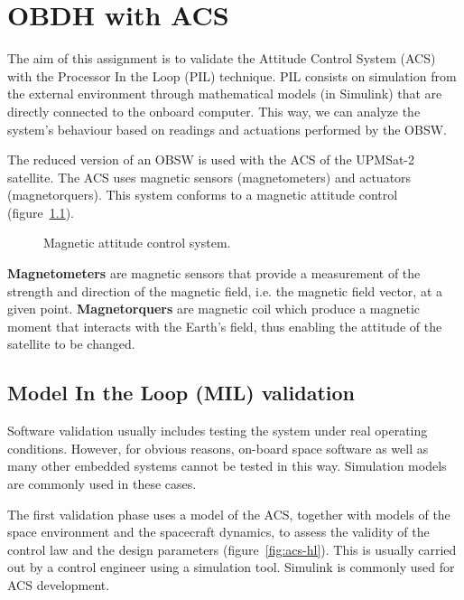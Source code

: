 \chapter{OBDH with ACS}\label{ch:obdh-acs}

The aim of this assignment is to validate the Attitude Control System (ACS)
with the Processor In the Loop (PIL) technique.
PIL consists on simulation from the external environment
through mathematical models (in Simulink)
that are directly connected to the onboard computer.
This way, we can analyze the system's behaviour
based on readings and actuations performed by the OBSW.

The reduced version of an OBSW
is used with the ACS of the UPMSat-2 satellite.
The ACS uses magnetic sensors (magnetometers) and actuators (magnetorquers).
This system conforms to a magnetic attitude control (figure~\ref{fig:acs}).

\begin{figure}[hbtp!]
	\caption{Magnetic attitude control system.}
	\label{fig:acs}
\end{figure}

\textbf{Magnetometers} are magnetic sensors
that provide a measurement of the strength
and direction of the magnetic field, i.e. the magnetic field vector,
at a given point.
\textbf{Magnetorquers} are magnetic coil which produce a magnetic moment that interacts with the Earth's field,
thus enabling the attitude of the satellite to be changed.


\section{Model In the Loop (MIL) validation}

Software validation usually includes testing the system under real operating conditions.
However, for obvious reasons, on-board space software as well as many other embedded systems cannot be tested in this way.
Simulation models are commonly used in these cases.

The first validation phase uses a model of the ACS,
together with models of the space environment and the spacecraft dynamics,
to assess the validity of the control law and the design parameters (figure~\ref{fig:acs-hl}).
This is usually carried out by a control engineer using a simulation tool.
Simulink is commonly used for ACS development.


